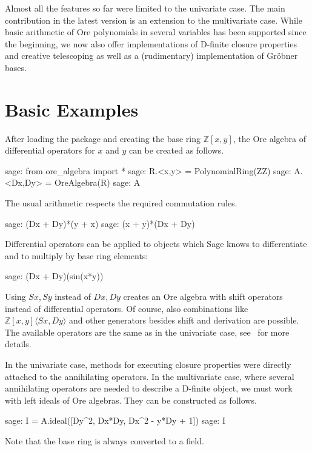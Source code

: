 \documentclass[11pt]{article}
\def\<#1>{\langle#1\rangle}
\let\set\mathbb
\begin{document}
Almost all the features so far were limited to the univariate case. The main contribution in the
latest version is an extension to the multivariate case. While basic arithmetic of Ore polynomials
in several variables has been supported since the beginning, we now also offer implementations of
D-finite closure properties and creative telescoping as well as a (rudimentary) implementation of
Gr\"obner bases. 

\section{Basic Examples}

After loading the package and creating the base ring $\set Z[x,y]$, the Ore algebra of differential
operators for $x$ and $y$ can be created as follows. 
\begin{sageexample}
  sage: from ore_algebra import *
  sage: R.<x,y> = PolynomialRing(ZZ)
  sage: A.<Dx,Dy> = OreAlgebra(R)
  sage: A
\end{sageexample}
The usual arithmetic respects the required commutation rules. 
\begin{sageexample}
  sage: (Dx + Dy)*(y + x)
  sage: (x + y)*(Dx + Dy)
\end{sageexample}
Differential operators can be applied to objects which Sage knows to differentiate and to multiply
by base ring elements:
\begin{sageexample}
  sage: (Dx + Dy)(sin(x*y))
\end{sageexample}
Using $Sx,Sy$ instead of $Dx,Dy$ creates an Ore algebra with shift operators instead of differential operators.
Of course, also combinations like $\set Z[x,y]\<Sx,Dy>$ and other generators besides shift and derivation are possible.
The available operators are the same as in the univariate case, see~\cite{kauers14b} for more details.

In the univariate case, methods for executing closure properties were directly attached to the annihilating operators.
In the multivariate case, where several annihilating operators are needed to describe a D-finite object, we must work
with left ideals of Ore algebras. They can be constructed as follows.
\begin{sageexample}
  sage: I = A.ideal([Dy^2, Dx*Dy, Dx^2 - y*Dy + 1])
  sage: I
\end{sageexample}
Note that the base ring is always converted to a field.
\end{document}
